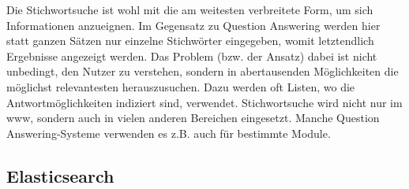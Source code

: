Die Stichwortsuche ist wohl mit die am weitesten verbreitete Form, um sich Informationen anzueignen.
Im Gegensatz zu Question Answering werden hier statt ganzen Sätzen nur einzelne Stichwörter eingegeben, womit letztendlich Ergebnisse angezeigt werden.
Das Problem (bzw. der Ansatz) dabei ist nicht unbedingt, den Nutzer zu verstehen, sondern in abertausenden Möglichkeiten die möglichst relevantesten herauszusuchen.
Dazu werden oft Listen, wo die Antwortmöglichkeiten indiziert sind, verwendet.
Stichwortsuche wird nicht nur im \ac{www}, sondern auch in vielen anderen Bereichen eingesetzt.
Manche Question Answering-Systeme verwenden es z.B. auch für bestimmte Module.

\subsection{Elasticsearch}

